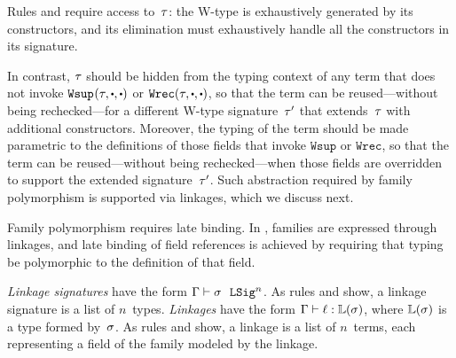

Rules  and  require access to~$\tau$:
the W-type is exhaustively generated by its constructors, and
its elimination must exhaustively handle all the constructors in
its signature.

In contrast, $\tau$ should be hidden from the typing context of any
term that does not invoke $\Wsup{}{\wsig}{\cDot}{\cDot}$ or $\Wrec{\wsig}{\cDot}{\cDot}$, so that
the term can be reused---without being rechecked---for a different
W-type signature~$\tau'$ that extends~$\tau$ with additional
constructors.
Moreover, the typing of the term should be made parametric to
the definitions of those fields that invoke $\texttt{Wsup}$ or $\texttt{Wrec}$,
so that the term can be reused---without being rechecked---when those fields
are overridden to support the extended signature~$\tau'$.
%
Such abstraction required by family polymorphism is supported via linkages,
which we discuss next.



Family polymorphism requires late binding.
In \TT, families are expressed through linkages, and late binding of
field references is achieved by requiring that typing be polymorphic to
the definition of that field.

\emph{Linkage signatures} have the form $ {\Gamma} \vdash {\ensuremath{\sigma}} \ \ \texttt{LSig}^{n} $.
As rules  and  show, a linkage
signature is a list of $n$~types.
%
\emph{Linkages} have the form $ {\Gamma} \vdash {\ensuremath{\ell}} : {\mathbb{L}({\sigma})} $,
where $\mathbb{L}({\sigma})$ is a type formed by~$\sigma$.
As rules  and  show, a linkage is a list
of $n$~terms, each representing a field of the family modeled by the linkage.

